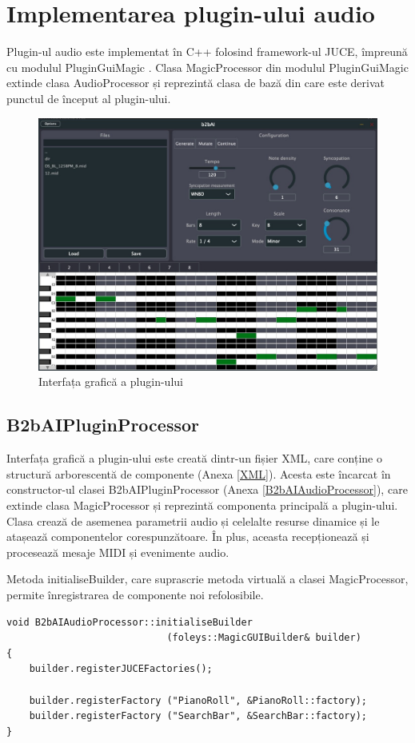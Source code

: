 \section{Implementarea plugin-ului audio} 
    \label{plugin}
    \noindent Plugin-ul audio este implementat în C++ folosind framework-ul JUCE, împreună cu modulul PluginGuiMagic  \cite{website:1}. Clasa MagicProcessor din modulul PluginGuiMagic extinde clasa AudioProcessor și reprezintă clasa de bază din care este derivat punctul de început al plugin-ului.
    \begin{figure}[H]
        \centering
        \includegraphics[scale=0.3]{images/interfata.jpeg}
        \caption{Interfața grafică a plugin-ului}
        \label{fig:interfata}
    \end{figure}
    \subsection{B2bAIPluginProcessor}
    \noindent Interfața grafică a plugin-ului este creată dintr-un fișier XML, care conține o structură arborescentă de componente (Anexa \ref{XML}). Acesta este încarcat în constructor-ul clasei B2bAIPluginProcessor (Anexa \ref{B2bAIAudioProcessor}), care extinde clasa MagicProcessor și reprezintă componenta principală a plugin-ului. Clasa crează de asemenea parametrii audio și celelalte resurse dinamice și le atașează componentelor corespunzătoare. În plus, aceasta recepționează și procesează mesaje MIDI și evenimente audio. \par
    Metoda initialiseBuilder, care suprascrie metoda virtuală a clasei MagicProcessor, permite înregistrarea de componente noi refolosibile.
    \begin{verbatim}
void B2bAIAudioProcessor::initialiseBuilder 
                            (foleys::MagicGUIBuilder& builder)
{
    builder.registerJUCEFactories();

    builder.registerFactory ("PianoRoll", &PianoRoll::factory);
    builder.registerFactory ("SearchBar", &SearchBar::factory);
}
    
    \end{verbatim}
